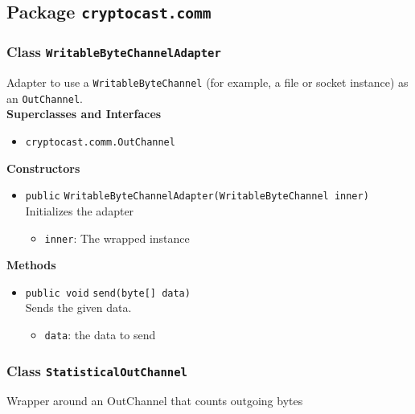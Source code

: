 \subsection{Package \lstinline!cryptocast.comm!}

\subsubsection{Class \lstinline|WritableByteChannelAdapter|}
Adapter to use a \lstinline|WritableByteChannel| (for example, a file or socket instance) as
 an \lstinline|OutChannel|. \\


\textbf{Superclasses and Interfaces}
\begin{itemize}
\item \lstinline|cryptocast.comm.OutChannel|
\end{itemize}



\textbf{Constructors}
\begin{itemize}
\item \lstinline|public| \lstinline|WritableByteChannelAdapter|\lstinline|(WritableByteChannel inner)|\\
Initializes the adapter
\begin{itemize}
\item \lstinline|inner|: The wrapped instance
\end{itemize}



\end{itemize}


\textbf{Methods}
\begin{itemize}
\item \lstinline|public void| \lstinline|send|\lstinline|(byte[] data)|\\
Sends the given data.
\begin{itemize}
\item \lstinline|data|: the data to send
\end{itemize}



\end{itemize}

\subsubsection{Class \lstinline|StatisticalOutChannel|}
Wrapper around an OutChannel that counts outgoing bytes \\


